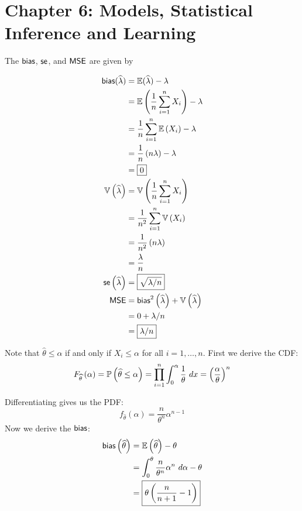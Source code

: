 \documentclass[a4paper]{article}
\begin{document}
\newpage
\section{Chapter 6: Models, Statistical Inference and Learning}

The \(\operatorname{\textsf{bias}} \), \( \operatorname{\textsf{se}} \), and \(\operatorname{\textsf{MSE}} \) are given by

\begin{align*}
	\textsf{bias}(\widehat{\lambda}) &= \mathbb{E}(\widehat{\lambda}) - \lambda \\
		& = \mathbb{E}\left( \frac{1}{n} \sum_{i=1}^{n} X_{i} \right) - \lambda \\
		& = \frac{1}{n} \sum_{i=1}^{n} \mathbb{E}\left( X_{i} \right) - \lambda \\
		& = \frac{1}{n} \left( n \lambda  \right) - \lambda \\
		& = \boxed{0} \\
	\mathbb{V}\left( \widehat{\lambda } \right) & = \mathbb{V}\left( \frac{1}{n} \sum_{i=1}^{n} X_{i} \right) \\
		& = \frac{1}{n^{2}} \sum_{i=1}^{n} \mathbb{V}\left( X_{i} \right) \\
		& = \frac{1}{n^{2}} \left( n \lambda  \right) \\
		& = \frac{\lambda }{n} \\
	\operatorname{\textsf{se}} \left( \widehat{\lambda } \right) & = \boxed{\sqrt{\lambda / n}} \\
	\operatorname{\textsf{MSE}} & = \operatorname{\textsf{bias}}^{2} \left( \widehat{\lambda } \right) + \mathbb{V}\left( \widehat{\lambda } \right) \\
		& = 0 + \lambda / n \\
		& = \boxed{\lambda / n}
\end{align*}


Note that \(\widehat{\theta} \le \alpha \) if and only if \(X_{i} \le \alpha \) for all \(i = 1, \dots, n\). First we derive the \textsf{CDF}:
\[
	F_{\widehat{\theta}}\left( \alpha  \right) = \mathbb{P}\left( \widehat{\theta} \le \alpha  \right) = \prod_{i=1}^{n} \int^{\alpha }_{0} \frac{1}{\theta} \ dx = \left( \frac{\alpha }{\theta} \right)^{n} 
\]

Differentiating gives us the \textsf{PDF}:
\[
	f_{\widehat{\theta}}\left( \alpha  \right) = \frac{n}{\theta^{n}} \alpha^{n-1}
\]
Now we derive the \(\operatorname{\textsf{bias}} \):
\begin{align*}
	\operatorname{\textsf{bias}} \left( \widehat{\theta} \right)  & = \mathbb{E}\left( \widehat{\theta} \right) - \theta \\
	 & = \int^{\theta}_{0} \frac{n}{\theta^{n}} \alpha^{n} \ d \alpha - \theta \\ 
	 & = \boxed{\theta \left( \frac{n}{n+1} - 1 \right)}
\end{align*} 
\end{document}
